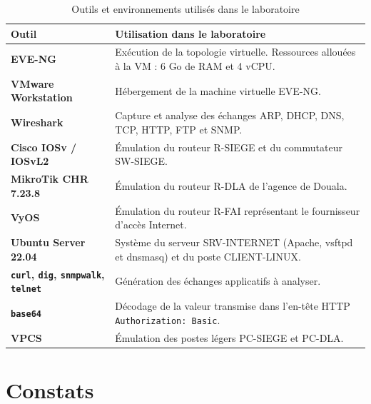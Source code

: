 \documentclass[11pt,a4paper]{article}
\renewcommand{\arraystretch}{1.25}
\begin{document}
	\begin{table}[H]
		\centering
		\small
		\renewcommand{\arraystretch}{1.15}
		\begin{tabularx}{\linewidth}{
				>{\raggedright\arraybackslash\bfseries}p{3.6cm}
				>{\raggedright\arraybackslash}X
			}
			\toprule
			Outil & Utilisation dans le laboratoire \\
			\midrule
			
			EVE-NG &
			Exécution de la topologie virtuelle.
			Ressources allouées à la VM : 6 Go de RAM et 4 vCPU. \\
			
			VMware Workstation &
			Hébergement de la machine virtuelle EVE-NG. \\
			
			Wireshark &
			Capture et analyse des échanges ARP, DHCP, DNS, TCP,
			HTTP, FTP et SNMP. \\
			
			Cisco IOSv / IOSvL2 &
			Émulation du routeur R-SIEGE et du commutateur SW-SIEGE. \\
			
			MikroTik CHR 7.23.8 &
			Émulation du routeur R-DLA de l'agence de Douala. \\
			
			VyOS &
			Émulation du routeur R-FAI représentant le fournisseur
			d'accès Internet. \\
			
			Ubuntu Server 22.04 &
			Système du serveur SRV-INTERNET
			(Apache, vsftpd et dnsmasq) et du poste CLIENT-LINUX. \\
			
			\texttt{curl}, \texttt{dig},
			\texttt{snmpwalk}, \texttt{telnet} &
			Génération des échanges applicatifs à analyser. \\
			
			\texttt{base64} &
			Décodage de la valeur transmise dans l'en-tête
			HTTP \texttt{Authorization: Basic}. \\
			
			VPCS &
			Émulation des postes légers PC-SIEGE et PC-DLA. \\
			
			\bottomrule
		\end{tabularx}
		\caption{Outils et environnements utilisés dans le laboratoire}
		\label{tab:outils}
	\end{table}
	
	\section{Constats}
	
\end{document}
